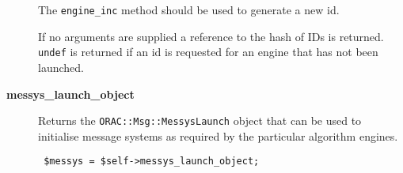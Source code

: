 \begin{description}
The \texttt{engine\_inc} method should be used to generate a new id.



If no arguments are supplied a reference to the hash of IDs is
returned. \texttt{undef} is returned if an id is requested for an
engine that has not been launched.

\item[\textbf{messys\_launch\_object}] \mbox{}

Returns the \texttt{ORAC::Msg::MessysLaunch} object that can be used
to initialise message systems as required by the particular
algorithm engines.

\begin{verbatim}
 $messys = $self->messys_launch_object;
\end{verbatim}
\end{description}
